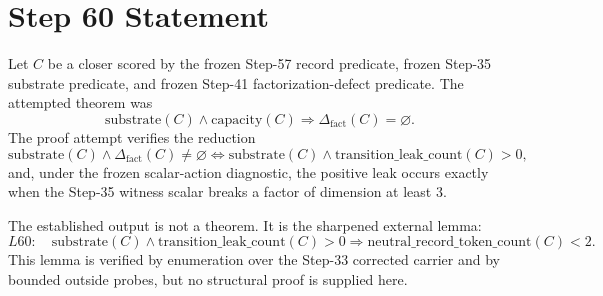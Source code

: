 \documentclass[11pt]{article}
\begin{document}
\section*{Step 60 Statement}
Let \(C\) be a closer scored by the frozen Step-57 record predicate, frozen Step-35 substrate predicate, and frozen Step-41 factorization-defect predicate. The attempted theorem was
\[
  \mathrm{substrate}(C)\wedge \mathrm{capacity}(C) \Rightarrow \Delta_{\mathrm{fact}}(C)=\varnothing.
\]
The proof attempt verifies the reduction
\[
  \mathrm{substrate}(C)\wedge \Delta_{\mathrm{fact}}(C)\ne\varnothing
  \Longleftrightarrow
  \mathrm{substrate}(C)\wedge \mathrm{transition\_leak\_count}(C)>0,
\]
and, under the frozen scalar-action diagnostic, the positive leak occurs exactly when the Step-35 witness scalar breaks a factor of dimension at least \(3\).

The established output is not a theorem. It is the sharpened external lemma:
\[
  L60:\quad
  \mathrm{substrate}(C)\wedge \mathrm{transition\_leak\_count}(C)>0
  \Rightarrow
  \mathrm{neutral\_record\_token\_count}(C)<2.
\]
This lemma is verified by enumeration over the Step-33 corrected carrier and by bounded outside probes, but no structural proof is supplied here.
\end{document}
